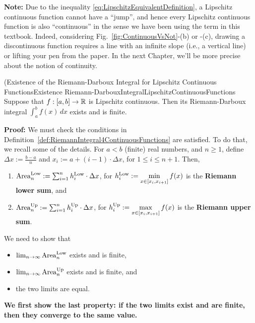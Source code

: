 \textbf{Note:} Due to the inequality \eqref{eq:LipschitzEquivalentDefinition}, a Lipschitz continuous function cannot have a ``jump'', and hence every Lipschitz continuous function is also ``continuous'' in the sense we have been using the term in this textbook. Indeed, considering Fig.~\ref{fig:ContinuousVsNot}-(b) or -(c), drawing a discontinuous function requires a line with an infinite slope (i.e., a vertical line) or lifting your pen from the paper. In the next Chapter, we'll be more precise about the notion of continuity.
\Qed


\begin{propColor}{(Existence of the Riemann-Darboux Integral for Lipschitz Continuous Functions}{Existence Riemann-DarbouxIntegralLipschitzContinuousFunctions} Suppose that $f:[a, b] \to \mathbb R$ is Lipschitz continuous. Then its Riemann-Darboux integral $\int_a^b f(x) \, dx$ exists and is finite.    
\end{propColor}

\textbf{Proof:} We must check the conditions in Definition~\ref{def:RiemannIntegral4ContinuousFunctions} are satisfied. To do that, we recall some of the details. For $a < b$ (finite) real numbers, and $n\ge 1$, define $\Delta x := \frac{b-a}{n}$ and $x_i := a + (i-1) \cdot \Delta x$, for $1 \le i \le n+1$. Then, 
\begin{enumerate}
\renewcommand{\labelenumi}{(\alph{enumi})}
\setlength{\itemsep}{.2cm}
    \item  ${\rm Area}^{\rm Low}_n : = \sum_{i=1}^n h_i^{\rm Low} \cdot \Delta x$, for $h_i^{\rm Low}:= \displaystyle \min_{x \in [x_i, x_{i+1}]} f(x)$ is the \textbf{Riemann lower sum}, and 
     \item  ${\rm Area}^{\rm Up}_n : = \sum_{i=1}^n h_i^{\rm Up} \cdot \Delta x$, for $h_i^{\rm Up}:= \displaystyle \max_{x \in [x_i, x_{i+1}]} f(x)$ is the \textbf{Riemann upper sum}.
\end{enumerate}
We need to show that 
\begin{itemize}
    \item $ \lim_{n \to \infty} {\rm Area}^{\rm Low}_n$ exists and is finite, 
    \item $\lim_{n \to \infty} {\rm Area}^{\rm Up}_n $ exists and is finite, and
    \item the two limits are equal.
\end{itemize}

\textbf{We first show the last property: if the two limits exist and are finite, then they converge to the same value.} \\

